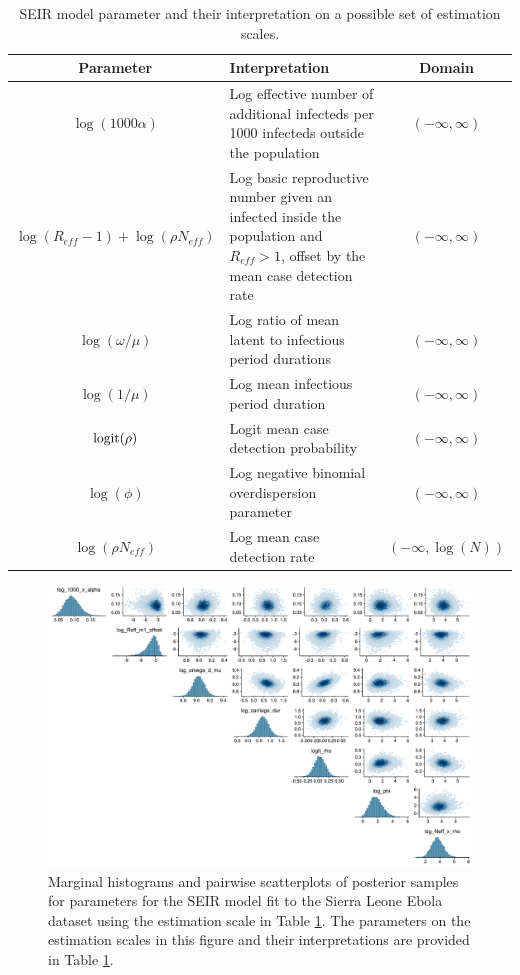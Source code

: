 \begin{table}[htbp]
	\caption{SEIR model parameter and their interpretation on a possible set of estimation scales.}
	\label{tab:seir_params_est3}
	\footnotesize
	\centering
	\begin{tabular}{clc}
		\hline
		\textbf{Parameter} & \textbf{Interpretation} & \textbf{Domain}\\
		\hline
		$\log(1000\alpha)$ & \makecell[l]{Log effective number of additional infecteds per \\ 1000 infecteds outside the population} & $(-\infty,\infty) $ \\
		$ \log(R_{eff} - 1) + \log(\rho N_{eff}) $ & \makecell[l]{Log basic reproductive number given an infected\\ inside the population and $ R_{eff} > 1 $, offset\\ by the mean case detection rate} & $(-\infty,\infty) $\\
		$ \log(\omega/\mu) $ & Log ratio of mean latent to infectious period durations & $(-\infty,\infty) $\\
		$ \log(1/\mu) $ & Log mean infectious period duration & $ (-\infty,\infty) $\\
		$ \mathrm{logit}(\rho) $ & Logit mean case detection probability & $(-\infty,\infty) $\\
		$ \log(\phi) $ & Log negative binomial overdispersion parameter & $ (-\infty,\infty) $ \\
		$ \log(\rho N_{eff}) $ & Log mean case detection rate & $(-\infty,\log(N))$\\
		\hline
	\end{tabular}
\end{table}

\begin{figure}[htbp]
	\centering
	\includegraphics[width=\linewidth]{figures/sln_pairs_t2}
	\caption[Posterior scatterplots for linear combinations of transformed Sierra Leone SEIR model parameters.]{Marginal histograms and pairwise scatterplots of posterior samples for parameters for the SEIR model fit to the Sierra Leone Ebola dataset using the estimation scale in Table \ref{tab:seir_params_est3}. The parameters on the estimation scales in this figure and their interpretations are provided in Table \ref{tab:seir_params_est3}.} 
	\label{fig:slpairs3}
\end{figure}

